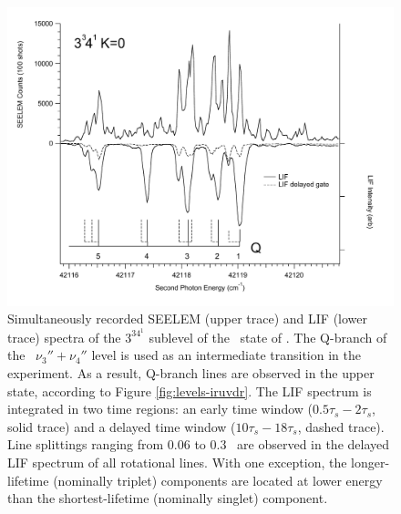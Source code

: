 \documentclass[12pt]{mitthesis}
\begin{document}
\begin{figure}
  \caption{Simultaneously recorded SEELEM (upper trace) and LIF (lower
    trace) spectra of the $3^34^1$  sublevel of the \astate\
    state of .  The Q-branch of the \xstate\ $\nu_3'' +
    \nu_4''$ level is used as an intermediate transition in the
    experiment.  As a result, Q-branch lines are observed in the upper
    state, according to Figure \ref{fig:levels-iruvdr}.  The LIF
    spectrum is integrated in two time regions: an early time window
    ($0.5\tau_s-2\tau_s$, solid trace) and a delayed time window
    ($10\tau_s-18\tau_s$, dashed trace).  Line splittings ranging from
    0.06 to 0.3 \rcm\ are observed in the delayed LIF spectrum of all
    rotational lines.  With one exception, the longer-lifetime
    (nominally triplet) components are located at lower energy than
    the shortest-lifetime (nominally singlet) component. }
  \label{fig:survey-3341}
  \centering
  \includegraphics[width=7in,angle=90]{spectrum-3341-q5q1-split.pdf}
\end{figure}
\end{document}
